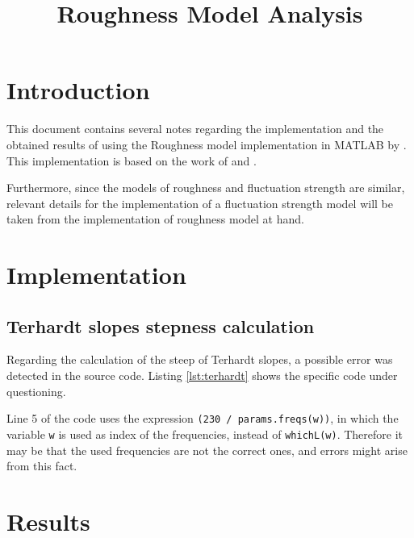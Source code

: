 \documentclass[a4paper]{article}
\begin{document}
\title{\citeauthor{Schrader2002Matlab} Roughness Model Analysis}

\maketitle

\section{Introduction} 

This document contains several notes regarding the implementation and the
obtained results of using the Roughness model implementation in MATLAB by
\citet{Schrader2002Matlab}. This implementation is based on the work of
\citet{Aures1985Ein} and \citet{Daniel1997Psychoacoustical}.

Furthermore, since the models of roughness and fluctuation strength are similar,
relevant details for the implementation of a fluctuation strength model will be
taken from the implementation of roughness model at hand.

\section{Implementation}

\subsection{Terhardt slopes stepness calculation}

Regarding the calculation of the steep of Terhardt slopes, a possible error was
detected in the source code. Listing \ref{lst:terhardt} shows the specific code
under questioning.



Line 5 of the code uses the expression
\lstinline[style=MATLAB-editor]!(230 / params.freqs(w))!, in which the variable
\lstinline[style=MATLAB-editor]!w! is used as index of the frequencies, instead
of \lstinline[style=MATLAB-editor]!whichL(w)!. Therefore it may be that the used
frequencies are not the correct ones, and errors might arise from this fact.

\section{Results}
\end{document}
